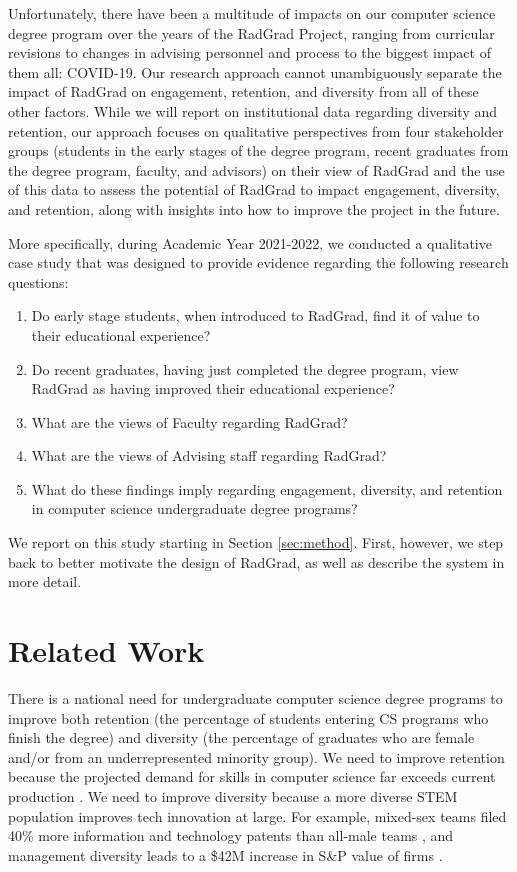 \documentclass[acmsmall]{acmart}
\begin{document}
Unfortunately, there have been a multitude of impacts on our computer science degree program over the years of the RadGrad Project, ranging from curricular revisions to changes in advising personnel and process to the biggest impact of them all: COVID-19.  Our research approach cannot unambiguously separate the impact of RadGrad on engagement, retention, and diversity from all of these other factors.  While we will report on institutional data regarding diversity and retention, our approach focuses on qualitative perspectives from four stakeholder groups (students in the early stages of the degree program, recent graduates from the degree program, faculty, and advisors) on their view of RadGrad and the use of this data to assess the potential of RadGrad to impact engagement, diversity, and retention, along with insights into how to improve the project in the future.

More specifically, during Academic Year 2021-2022, we conducted a qualitative case study that was designed to provide evidence regarding the following research questions:

\begin{enumerate}
\item Do early stage students, when introduced to RadGrad, find it of value to their educational experience?
\item Do recent graduates, having just completed the degree program, view RadGrad as having improved their educational experience?
\item What are the views of Faculty regarding RadGrad?
\item What are the views of Advising staff regarding RadGrad?
\item What do these findings imply regarding engagement, diversity, and retention in computer science undergraduate degree programs?
\end{enumerate}

We report on this study starting in Section \ref{sec:method}. First, however, we step back to better motivate the design of RadGrad, as well as describe the system in more detail.

\section{Related Work}
\label{sec:related-work}

There is a national need for undergraduate computer science degree programs to improve both retention (the percentage of students entering CS programs who finish the degree) and diversity (the percentage of graduates who are female and/or from an underrepresented minority group).  We need to improve retention because the projected demand for skills in computer science far exceeds current production \cite{camp_generation_2017}.  We need to improve diversity because a more diverse STEM population improves tech innovation at large. For example, mixed-sex teams filed 40\% more information and technology patents than all-male teams \cite{ashcraft_who_2012}, and management diversity leads to a \$42M increase in S\&P value of firms \cite{dezso_girl_2007}.
\end{document}
